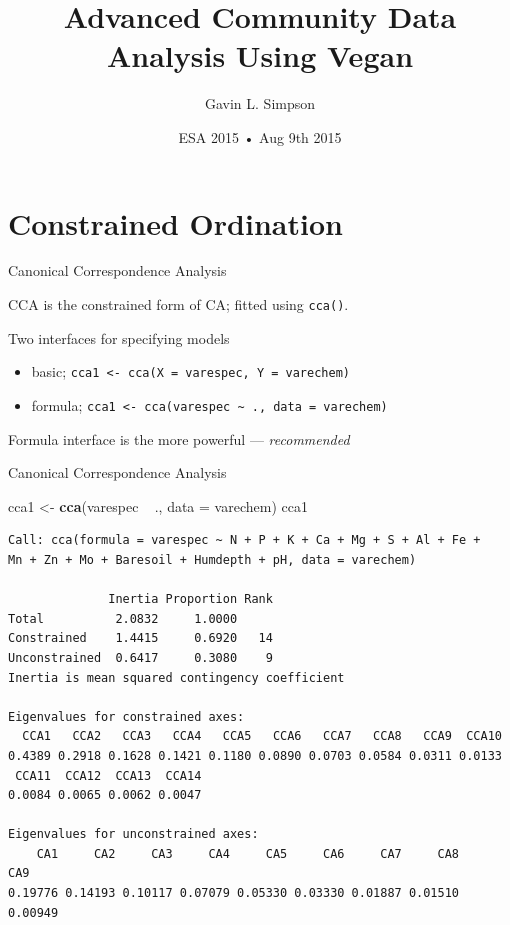 \documentclass[10pt,ignorenonframetext,compress, aspectratio=169]{beamer}
\title{Advanced Community Data Analysis Using Vegan}
\author{Gavin L. Simpson}
\date{ESA 2015 • Aug 9th 2015}
\newenvironment{Shaded}{\begin{snugshade}}{\end{snugshade}}
\newcommand{\KeywordTok}[1]{\textcolor[rgb]{0.13,0.29,0.53}{\textbf{{#1}}}}
\newcommand{\DataTypeTok}[1]{\textcolor[rgb]{0.13,0.29,0.53}{{#1}}}
\newcommand{\StringTok}[1]{\textcolor[rgb]{0.31,0.60,0.02}{{#1}}}
\newcommand{\NormalTok}[1]{{#1}}
\begin{document}
\frame{\titlepage}

\section{Constrained Ordination}\label{constrained-ordination}

\begin{frame}{Canonical Correspondence Analysis}

CCA is the constrained form of CA; fitted using \texttt{cca()}.

Two interfaces for specifying models

\begin{itemize}
\itemsep1pt\parskip0pt
\item
  basic;
  \texttt{cca1\ \textless{}-\ cca(X\ =\ varespec,\ Y\ =\ varechem)}
\item
  formula;
  \texttt{cca1\ \textless{}-\ cca(varespec\ \textasciitilde{}\ .,\ data\ =\ varechem)}
\end{itemize}

Formula interface is the more powerful --- \emph{recommended}

\end{frame}

\begin{frame}[fragile]{Canonical Correspondence Analysis}

\tiny

\begin{Shaded}
\begin{Highlighting}[]
\NormalTok{cca1 <-}\StringTok{ }\KeywordTok{cca}\NormalTok{(varespec ~}\StringTok{ }\NormalTok{., }\DataTypeTok{data =} \NormalTok{varechem)}
\NormalTok{cca1}
\end{Highlighting}
\end{Shaded}

\begin{verbatim}
Call: cca(formula = varespec ~ N + P + K + Ca + Mg + S + Al + Fe +
Mn + Zn + Mo + Baresoil + Humdepth + pH, data = varechem)

              Inertia Proportion Rank
Total          2.0832     1.0000     
Constrained    1.4415     0.6920   14
Unconstrained  0.6417     0.3080    9
Inertia is mean squared contingency coefficient 

Eigenvalues for constrained axes:
  CCA1   CCA2   CCA3   CCA4   CCA5   CCA6   CCA7   CCA8   CCA9  CCA10 
0.4389 0.2918 0.1628 0.1421 0.1180 0.0890 0.0703 0.0584 0.0311 0.0133 
 CCA11  CCA12  CCA13  CCA14 
0.0084 0.0065 0.0062 0.0047 

Eigenvalues for unconstrained axes:
    CA1     CA2     CA3     CA4     CA5     CA6     CA7     CA8     CA9 
0.19776 0.14193 0.10117 0.07079 0.05330 0.03330 0.01887 0.01510 0.00949 
\end{verbatim}

\normalsize

\end{frame}
\end{document}
